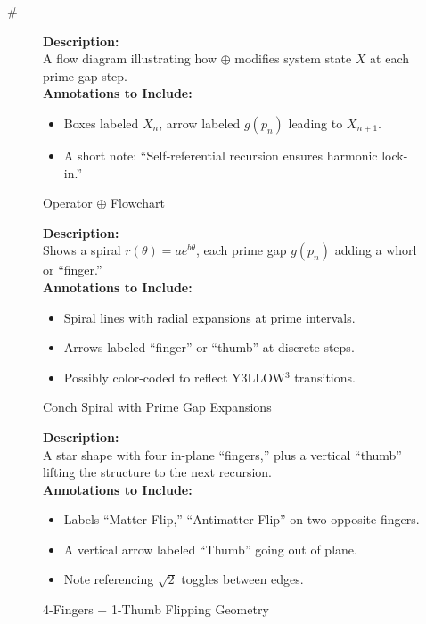#  \documentclass[11pt]{article}
\begin{document}
\begin{figure}[p]
\caption{Operator \texorpdfstring{$\oplus$}{\oplus} Flowchart}
\label{fig:oplusFlow}
\textbf{Description:}\\
A flow diagram illustrating how \(\oplus\) modifies system state \(X\) at each prime gap step.\\[0.5em]
\textbf{Annotations to Include:}
\begin{itemize}
    \item Boxes labeled $X_n$, arrow labeled $g(p_n)$ leading to $X_{n+1}$.
    \item A short note: “Self-referential recursion ensures harmonic lock-in.”
\end{itemize}
\end{figure}

\begin{figure}[p]
\caption{Conch Spiral with Prime Gap Expansions}
\label{fig:conchSpiral}
\textbf{Description:}\\
Shows a spiral \(r(\theta) = a e^{b\theta}\), each prime gap \(g(p_n)\) adding a whorl or “finger.”\\[0.5em]
\textbf{Annotations to Include:}
\begin{itemize}
    \item Spiral lines with radial expansions at prime intervals.
    \item Arrows labeled “finger” or “thumb” at discrete steps.
    \item Possibly color-coded to reflect Y3LLOW$^3$ transitions.
\end{itemize}
\end{figure}

\begin{figure}[p]
\caption{4-Fingers + 1-Thumb Flipping Geometry}
\label{fig:fourFingers}
\textbf{Description:}\\
A star shape with four in-plane “fingers,” plus a vertical “thumb” lifting the structure to the next recursion.\\[0.5em]
\textbf{Annotations to Include:}
\begin{itemize}
    \item Labels “Matter Flip,” “Antimatter Flip” on two opposite fingers.
    \item A vertical arrow labeled “Thumb” going out of plane.
    \item Note referencing $\sqrt{2}$ toggles between edges.
\end{itemize}
\end{figure}
\end{document}
